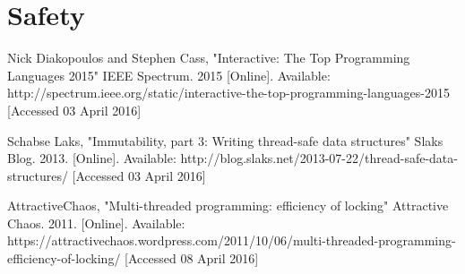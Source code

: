 \documentclass[11pt]{article}
\begin{document}
\section{Safety}
\clearpage

\begin{thebibliography}{9}

  Nick Diakopoulos and Stephen Cass,
  "Interactive: The Top Programming Languages 2015"
  IEEE Spectrum.
  2015
  [Online].
  Available: http://spectrum.ieee.org/static/interactive-the-top-programming-languages-2015
  [Accessed 03 April 2016]

  Schabse Laks,
  "Immutability, part 3: Writing thread-safe data structures"
  Slaks Blog.
  2013.
  [Online].
  Available: http://blog.slaks.net/2013-07-22/thread-safe-data-structures/
  [Accessed 03 April 2016]

  AttractiveChaos,
  "Multi-threaded programming: efficiency of locking"
  Attractive Chaos.
  2011.
  [Online].
  Available: https://attractivechaos.wordpress.com/2011/10/06/multi-threaded-programming-efficiency-of-locking/
  [Accessed 08 April 2016]

\end{thebibliography}
\end{document}
